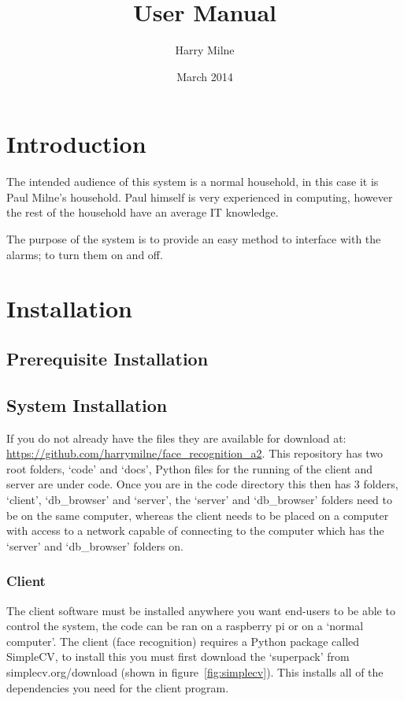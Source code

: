 \documentclass[a4paper]{article}
\title{User Manual}
\author{Harry Milne}
\date{March 2014}
\begin{document}
\maketitle
\tableofcontents
\newpage

\section{Introduction}

    The intended audience of this system is a normal household, in this case it is Paul Milne's household. Paul himself is very experienced
    in computing, however the rest of the household have an average IT knowledge.

    The purpose of the system is to provide an easy method to interface with the alarms; to turn them on and off.
\section{Installation}
    \subsection{Prerequisite Installation}

    \subsection{System Installation}
        If you do not already have the files they are available for download at: \url{https://github.com/harrymilne/face_recognition_a2}.
        This repository has two root folders, `code' and `docs', Python files for the running of the client and server are under code.
        Once you are in the code directory this then has 3 folders, `client', `db\_browser' and `server', the `server' and `db\_browser'
        folders need to be on the same computer, whereas the client needs to be placed on a computer with access to a network capable of
        connecting to the computer which has the `server' and `db\_browser' folders on. 

    \subsubsection{Client}
        The client software must be installed anywhere you want end-users to be able to control the system, the code can be ran on a 
        raspberry pi or on a `normal computer'. 
        The client (face recognition) requires a Python package called SimpleCV, to install this you must first 
        download the `superpack' from simplecv.org/download (shown in figure~\ref{fig:simplecv}).  This installs all of the dependencies you need for the client program.
\end{document}
